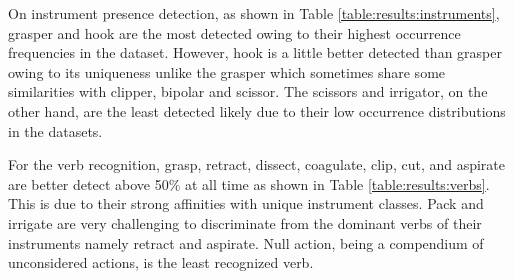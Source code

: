 \documentclass{article}
\begin{document}
{On instrument presence detection, as shown in Table \ref{table:results:instruments}, grasper and hook are the most detected owing to their highest occurrence frequencies in the dataset. However, hook is a little better detected than grasper owing to its uniqueness unlike the grasper which sometimes share some similarities with clipper, bipolar and scissor. The scissors and irrigator, on the other hand, are the least detected likely due to their low occurrence distributions in the datasets.


\begin{table}[ht]
    \captionsetup{skip=0pt,singlelinecheck=off,justification=raggedright}
    \caption{Per-class instrument presence detection AP (\%) on cross-validation splits (Method in PyTorch)}
    \label{table:results:instruments}
    \centering
    \setlength{\tabcolsep}{11pt}
\end{table} 
For the verb recognition, grasp, retract, dissect, coagulate, clip, cut, and aspirate are better detect above 50\% at all time as shown in Table \ref{table:results:verbs}. This is due to their strong affinities with unique instrument classes. Pack and irrigate are very challenging to discriminate from the dominant verbs of their instruments namely retract and aspirate. Null action, being a compendium of unconsidered actions, is the least recognized verb.


}
\end{document}
